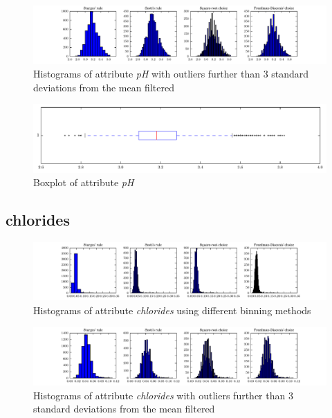 \documentclass{report}
\begin{document}
\begin{figure}[H]
\includegraphics[width=\textwidth]{histograms/pH_filtered.pdf}
\caption{Histograms of attribute \emph{pH} with outliers further than 3 standard deviations from the mean filtered}\n\end{figure}

\begin{figure}[H]
\includegraphics[width=\textwidth]{boxplots/pH.pdf}
\caption{Boxplot of attribute \emph{pH}}\end{figure}

\newpage\subsection{chlorides}
\begin{figure}[H]
\includegraphics[width=\textwidth]{histograms/chlorides.pdf}
\caption{Histograms of attribute \emph{chlorides} using different binning methods}\end{figure}

\begin{figure}[H]
\includegraphics[width=\textwidth]{histograms/chlorides_filtered.pdf}
\caption{Histograms of attribute \emph{chlorides} with outliers further than 3 standard deviations from the mean filtered}\n\end{figure}
\end{document}
